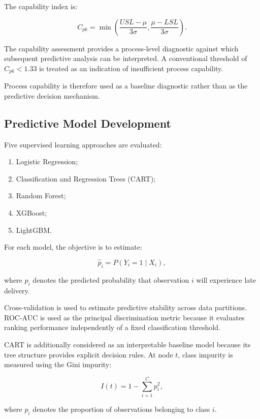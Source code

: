 \documentclass[11pt,a4paper]{article}
\begin{document}
The capability index is:

\begin{equation}
C_{pk} =
\min\left(
\frac{USL-\mu}{3\sigma},
\frac{\mu-LSL}{3\sigma}
\right).
\end{equation}

The capability assessment provides a process-level diagnostic against which subsequent predictive analysis can be interpreted. A conventional threshold of $C_{pk}<1.33$ is treated as an indication of insufficient process capability.

Process capability is therefore used as a baseline diagnostic rather than as the predictive decision mechanism.


\subsection{Predictive Model Development}

Five supervised learning approaches are evaluated:

\begin{enumerate}
    \item Logistic Regression;
    \item Classification and Regression Trees (CART);
    \item Random Forest;
    \item XGBoost;
    \item LightGBM.
\end{enumerate}

For each model, the objective is to estimate:

\[
\hat{p}_i=P(Y_i=1\mid X_i),
\]

where $\hat{p}_i$ denotes the predicted probability that observation $i$ will experience late delivery.

Cross-validation is used to estimate predictive stability across data partitions. ROC-AUC is used as the principal discrimination metric because it evaluates ranking performance independently of a fixed classification threshold.

CART is additionally considered as an interpretable baseline model because its tree structure provides explicit decision rules. At node $t$, class impurity is measured using the Gini impurity:

\begin{equation}
I(t)=1-\sum_{i=1}^{C}p_i^2,
\end{equation}

where $p_i$ denotes the proportion of observations belonging to class $i$.
\end{document}
